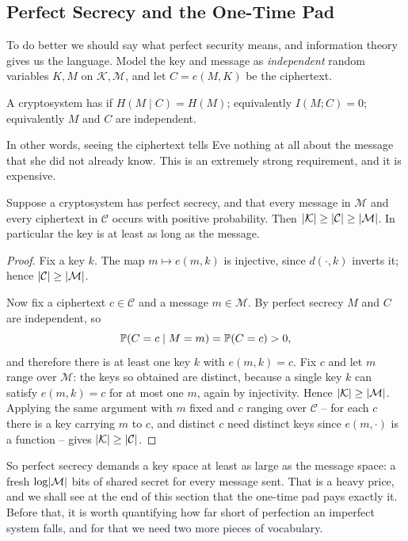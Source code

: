 \documentclass[a4paper]{scrartcl}
\newcommand{\Cc}{\mathcal{C}}
\newcommand{\Kc}{\mathcal{K}}
\newcommand{\Mc}{\mathcal{M}}
\begin{document}
\subsection{Perfect Secrecy and the One-Time Pad}

To do better we should say what perfect security means, and information theory gives us the language. Model the key and message as \emph{independent} random variables $K, M$ on $\Kc,\Mc$, and let $C = e(M,K)$ be the ciphertext.

\begin{definition}
	A cryptosystem has  if $H(M\mid C) = H(M)$; equivalently $I(M;C)=0$; equivalently $M$ and $C$ are independent.
\end{definition}

In other words, seeing the ciphertext tells Eve nothing at all about the message that she did not already know. This is an extremely strong requirement, and it is expensive.

\begin{proposition}[Shannon]\label{prop:keylength}
	Suppose a cryptosystem has perfect secrecy, and that every message in $\Mc$ and every ciphertext in $\Cc$ occurs with positive probability. Then $\abs{\Kc}\ge\abs{\Cc}\ge\abs{\Mc}$. In particular the key is at least as long as the message.
\end{proposition}

\begin{proof}
	Fix a key $k$. The map $m \mapsto e(m,k)$ is injective, since $d(\cdot,k)$ inverts it; hence $\abs{\Cc}\ge\abs{\Mc}$.

	Now fix a ciphertext $c \in \Cc$ and a message $m \in \Mc$. By perfect secrecy $M$ and $C$ are independent, so
	$$\mathbb{P}(C = c \mid M = m) = \mathbb{P}(C = c) > 0,$$
	and therefore there is at least one key $k$ with $e(m,k) = c$. Fix $c$ and let $m$ range over $\Mc$: the keys so obtained are distinct, because a single key $k$ can satisfy $e(m,k) = c$ for at most one $m$, again by injectivity. Hence $\abs{\Kc}\ge\abs{\Mc}$. Applying the same argument with $m$ fixed and $c$ ranging over $\Cc$ -- for each $c$ there is a key carrying $m$ to $c$, and distinct $c$ need distinct keys since $e(m,\cdot)$ is a function -- gives $\abs{\Kc}\ge\abs{\Cc}$.
\end{proof}

So perfect secrecy demands a key space at least as large as the message space: a fresh $\log\abs{\Mc}$ bits of shared secret for every message sent. That is a heavy price, and we shall see at the end of this section that the one-time pad pays exactly it. Before that, it is worth quantifying how far short of perfection an imperfect system falls, and for that we need two more pieces of vocabulary.
\end{document}
